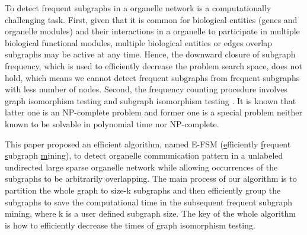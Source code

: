\documentclass[9pt,oneside]{article}
\begin{document}
To detect frequent subgraphs in a organelle network is a computationally challenging task. 
%
First, given that it is common for biological entities (genes and organelle modules) and their interactions in a organelle to participate in multiple biological functional modules, multiple biological entities or edges overlap subgraphs may be active at any time\cite{JinChen2006}. Hence, the downward closure of subgraph frequency, which is used to efficiently decrease the problem search space\cite{kuramochi2005finding},
does not hold, which means we cannot detect frequent subgraphs from frequent subgraphs with less number of nodes\cite{}.
%
Second, the frequency counting procedure involves graph isomorphism testing\cite{fortin1996} and subgraph isomorphism testing \cite{ullmann1976algorithm}. It is known that latter one is an NP-complete problem \cite{Bruno2000,Johnson1979} and former one is a special problem neither known to be solvable in polynomial time nor NP-complete\cite{Johnson1979}.
%

This paper proposed an efficient algorithm, named E-FSM (\underline{e}fficiently \underline{f}requent \underline{s}ubgraph \underline{m}ining), to detect organelle communication pattern in a unlabeled undirected large sparse organelle network while allowing occurrences of the subgraphs to be arbitrarily overlapping. The main process of our algorithm is  to partition the whole graph to size-k subgraphs and then efficiently group the subgraphs to %
save the computational time in the subsequent frequent subgraph mining, where k is a user defined subgraph size. The key of the whole algorithm is how to efficiently decrease the times of graph isomorphism testing.

\end{document}
